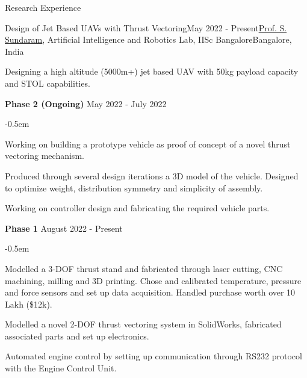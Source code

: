 \documentclass{resume} %
\begin{document}
\begin{rSection}{Research Experience}

 
\begin{rSubsection}{Design of Jet Based UAVs with Thrust Vectoring}{May 2022 - Present}{\href{https://scholar.google.co.in/citations?user=5iAMbhMAAAAJ&hl=en}{Prof. S. Sundaram}, Artificial Intelligence and Robotics Lab, IISc Bangalore}{Bangalore, India}
\item Designing a high altitude (5000m+) jet based UAV with 50kg payload capacity and STOL capabilities.
\item[] \textbf{Phase 2 (Ongoing)} \hfill {May 2022 - July 2022}
\begin{list}{\raisebox{0.3ex}{\tiny$\bullet$}}{\leftmargin=1em}
\itemsep -0.5em \vspace{-0.5em} %
    \item Working on building a prototype vehicle as proof of concept of a novel thrust vectoring mechanism.
    \item Produced through several design iterations a 3D model of the vehicle. Designed to optimize weight, distribution symmetry and simplicity of assembly.
    \item Working on controller design and fabricating the required vehicle parts.
\end{list}
\item[] \textbf{Phase 1} \hfill {August 2022 - Present}
\begin{list}{\raisebox{0.3ex}{\tiny$\bullet$}}{\leftmargin=1em}
\itemsep -0.5em \vspace{-0.5em} %
    \item Modelled a 3-DOF thrust stand and fabricated through laser cutting, CNC machining, milling and 3D printing. Chose and calibrated temperature, pressure and force sensors and set up data acquisition. Handled purchase worth over 10 Lakh (\$12k).
    \item Modelled a novel 2-DOF thrust vectoring system in SolidWorks, fabricated associated parts and set up electronics.
    \item Automated engine control by setting up communication through RS232 protocol with the Engine Control Unit.
\end{list}
\end{rSubsection}


\end{rSection}
\end{document}
